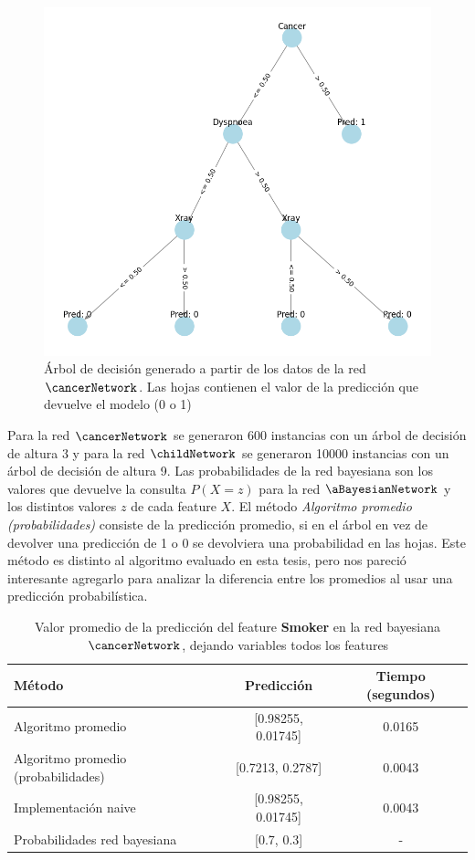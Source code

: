 \begin{figure}[ht]
    \centering
    \includegraphics[width=0.7\linewidth]{img/cancerDecisionTree.png}
    \caption{Árbol de decisión generado a partir de los datos de la red $\cancerNetwork$. Las hojas contienen el valor de la predicción que devuelve el modelo (0 o 1)}
    \label{fig:cancerDecisionTree}
\end{figure}

Para la red $\cancerNetwork$ se generaron 600 instancias con un árbol de decisión de altura 3 y para la red $\childNetwork$ se generaron 10000 instancias con un árbol de decisión de altura 9. Las probabilidades de la red bayesiana son los valores que devuelve la consulta $P(X = z)$ para la red $\aBayesianNetwork$ y los distintos valores $z$ de cada feature $X$. El método \emph{Algoritmo promedio (probabilidades)} consiste de la predicción promedio, si en el árbol en vez de devolver una predicción de 1 o 0 se devolviera una probabilidad en las hojas. Este método es distinto al algoritmo evaluado en esta tesis, pero nos pareció interesante agregarlo para analizar la diferencia entre los promedios al usar una predicción probabilística. 

\begin{table}[ht]
    \centering
    \begin{tabular}{l c c}
        \toprule
        \textbf{M\'etodo} & \textbf{Predicci\'on} & \textbf{Tiempo (segundos)} \\
        \midrule
        Algoritmo promedio & [0.98255, 0.01745] & 0.0165 \\
        Algoritmo promedio (probabilidades) & [0.7213, 0.2787] & 0.0043 \\
        Implementaci\'on naive & [0.98255, 0.01745] & 0.0043 \\
        Probabilidades red bayesiana & [0.7, 0.3] & - \\
        \bottomrule
    \end{tabular}
    \caption{Valor promedio de la predicci\'on del feature \textbf{Smoker} en la red bayesiana $\cancerNetwork$, dejando variables todos los features}
    \label{table:cancerMeanResults}
\end{table}

